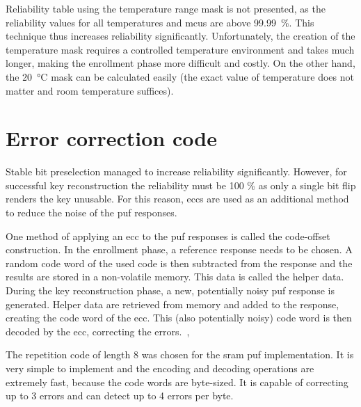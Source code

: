 Reliability table using the temperature range mask is not presented, as the reliability values for all temperatures and \glspl{mcu} are above 99.99~\%. This technique thus increases reliability significantly. Unfortunately, the creation of the temperature mask requires a controlled temperature environment and takes much longer, making the enrollment phase more difficult and costly. On the other hand, the 20~°C mask can be calculated easily (the exact value of temperature does not matter and room temperature suffices).


\section{Error correction code}\label{sec:ecc}

Stable bit preselection managed to increase reliability significantly. However, for successful key reconstruction the reliability must be 100 \% as only a single bit flip renders the key unusable. For this reason, \glspl{ecc} are used as an additional method to reduce the noise of the \gls{puf} responses.

One method of applying an \gls{ecc} to the \gls{puf} responses is called the code-offset construction. In the enrollment phase, a reference response needs to be chosen. A random code word of the used code is then subtracted from the response and the results are stored in a non-volatile memory. This data is called the helper data. During the key reconstruction phase, a new, potentially noisy \gls{puf} response is generated. Helper data are retrieved from memory and added to the response, creating the code word of the \gls{ecc}. This (also potentially noisy) code word is then decoded by the \gls{ecc}, correcting the errors.~\cite{Sven2015},~\cite{Dodis2008}

The repetition code of length 8 was chosen for the \gls{sram} \gls{puf} implementation. It is very simple to implement and the encoding and decoding operations are extremely fast, because the code words are byte-sized. It is capable of correcting up to 3 errors and can detect up to 4 errors per byte.

